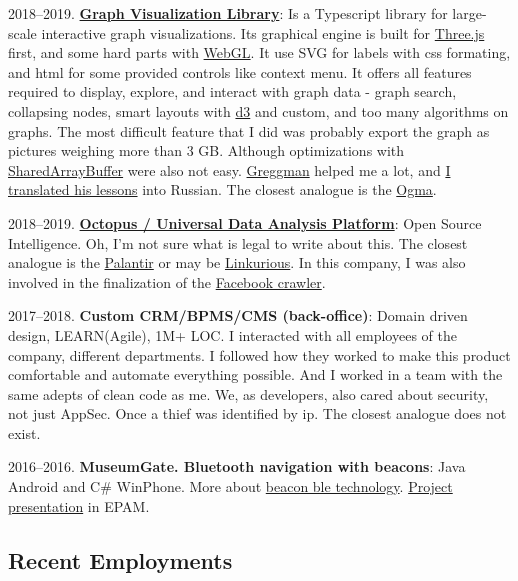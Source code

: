 \documentclass{yb}
\begin{document}
2018--2019. \href{https://baltinfocom.ru/BigData\#en}{\textbf{Graph Visualization Library}}: Is a Typescript library for large-scale interactive graph visualizations. Its graphical engine is built for \href{https://threejs.org/}{Three.js} first, and some hard parts with \href{https://webglfundamentals.org/}{WebGL}. It use SVG for labels with css formating, and html for some provided controls like context menu. It offers all features required to display, explore, and interact with graph data - graph search, collapsing nodes, smart layouts with \href{https://github.com/d3/d3-force}{d3} and custom, and too many algorithms on graphs. The most difficult feature that I did was probably export the graph as pictures weighing more than 3 GB. Although optimizations with \href{https://developer.mozilla.org/ru/docs/Web/JavaScript/Reference/Global_Objects/SharedArrayBuffer}{SharedArrayBuffer} were also not easy. \href{https://github.com/greggman}{Greggman} helped me a lot, and \href{https://webglfundamentals.org/}{I translated his lessons} into Russian. The closest analogue is the \href{https://doc.linkurio.us/ogma/latest/}{Ogma}.

2018--2019. \href{https://baltinfocom.ru/BigData\#en}{\textbf{Octopus / Universal Data Analysis Platform}}: Open Source Intelligence. Oh, I'm not sure what is legal to write about this.
The closest analogue is the \href{https://www.palantir.com/}{Palantir} or may be  \href{https://linkurio.us/}{Linkurious}.
In this company, I was also involved in the finalization of the \href{https://github.com/NikitaIT/facebook-crawling-nightmare}{Facebook crawler}.

2017--2018. \textbf{Custom CRM/BPMS/CMS (back-office)}: 
Domain driven design, LEARN(Agile), 1M+ LOC. I interacted with all employees of the company, different departments. I followed how they worked to make this product comfortable and automate everything possible. And I worked in a team with the same adepts of clean code as me. We, as developers, also cared about security, not just AppSec. Once a thief was identified by ip. The closest analogue does not exist. 

2016--2016. \textbf{MuseumGate. Bluetooth navigation with beacons}: Java Android and C\# WinPhone. More about \href{https://kontakt.io/what-is-a-beacon/}{beacon ble technology}. \href{https://www.youtube.com/watch?v=gVKDU043EWI&index=3&list=PLcV0FNC_1srD3xXbBG
9VIHRdKb4TMoM_p}{Project presentation} in EPAM.

\subsection*{Recent Employments}
\end{document}
